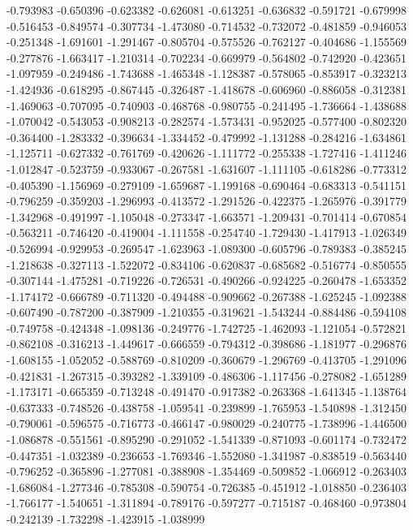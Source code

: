 -0.793983
-0.650396
-0.623382
-0.626081
-0.613251
-0.636832
-0.591721
-0.679998
-0.516453
-0.849574
-0.307734
-1.473080
-0.714532
-0.732072
-0.481859
-0.946053
-0.251348
-1.691601
-1.291467
-0.805704
-0.575526
-0.762127
-0.404686
-1.155569
-0.277876
-1.663417
-1.210314
-0.702234
-0.669979
-0.564802
-0.742920
-0.423651
-1.097959
-0.249486
-1.743688
-1.465348
-1.128387
-0.578065
-0.853917
-0.323213
-1.424936
-0.618295
-0.867445
-0.326487
-1.418678
-0.606960
-0.886058
-0.312381
-1.469063
-0.707095
-0.740903
-0.468768
-0.980755
-0.241495
-1.736664
-1.438688
-1.070042
-0.543053
-0.908213
-0.282574
-1.573431
-0.952025
-0.577400
-0.802320
-0.364400
-1.283332
-0.396634
-1.334452
-0.479992
-1.131288
-0.284216
-1.634861
-1.125711
-0.627332
-0.761769
-0.420626
-1.111772
-0.255338
-1.727416
-1.411246
-1.012847
-0.523759
-0.933067
-0.267581
-1.631607
-1.111105
-0.618286
-0.773312
-0.405390
-1.156969
-0.279109
-1.659687
-1.199168
-0.690464
-0.683313
-0.541151
-0.796259
-0.359203
-1.296993
-0.413572
-1.291526
-0.422375
-1.265976
-0.391779
-1.342968
-0.491997
-1.105048
-0.273347
-1.663571
-1.209431
-0.701414
-0.670854
-0.563211
-0.746420
-0.419004
-1.111558
-0.254740
-1.729430
-1.417913
-1.026349
-0.526994
-0.929953
-0.269547
-1.623963
-1.089300
-0.605796
-0.789383
-0.385245
-1.218638
-0.327113
-1.522072
-0.834106
-0.620837
-0.685682
-0.516774
-0.850555
-0.307144
-1.475281
-0.719226
-0.726531
-0.490266
-0.924225
-0.260478
-1.653352
-1.174172
-0.666789
-0.711320
-0.494488
-0.909662
-0.267388
-1.625245
-1.092388
-0.607490
-0.787200
-0.387909
-1.210355
-0.319621
-1.543244
-0.884486
-0.594108
-0.749758
-0.424348
-1.098136
-0.249776
-1.742725
-1.462093
-1.121054
-0.572821
-0.862108
-0.316213
-1.449617
-0.666559
-0.794312
-0.398686
-1.181977
-0.296876
-1.608155
-1.052052
-0.588769
-0.810209
-0.360679
-1.296769
-0.413705
-1.291096
-0.421831
-1.267315
-0.393282
-1.339109
-0.486306
-1.117456
-0.278082
-1.651289
-1.173171
-0.665359
-0.713248
-0.491470
-0.917382
-0.263368
-1.641345
-1.138764
-0.637333
-0.748526
-0.438758
-1.059541
-0.239899
-1.765953
-1.540898
-1.312450
-0.790061
-0.596575
-0.716773
-0.466147
-0.980029
-0.240775
-1.738996
-1.446500
-1.086878
-0.551561
-0.895290
-0.291052
-1.541339
-0.871093
-0.601174
-0.732472
-0.447351
-1.032389
-0.236653
-1.769346
-1.552080
-1.341987
-0.838519
-0.563440
-0.796252
-0.365896
-1.277081
-0.388908
-1.354469
-0.509852
-1.066912
-0.263403
-1.686084
-1.277346
-0.785308
-0.590754
-0.726385
-0.451912
-1.018850
-0.236403
-1.766177
-1.540651
-1.311894
-0.789176
-0.597277
-0.715187
-0.468460
-0.973804
-0.242139
-1.732298
-1.423915
-1.038999
